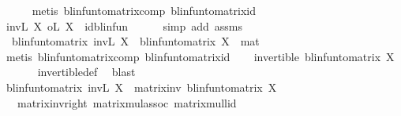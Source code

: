 \begin{isabellebody}
\ \ \ \ \isamarkupfalse%
\ {\isacharparenleft}{\kern0pt}metis\ blinfun{\isacharunderscore}{\kern0pt}to{\isacharunderscore}{\kern0pt}matrix{\isacharunderscore}{\kern0pt}comp\ blinfun{\isacharunderscore}{\kern0pt}to{\isacharunderscore}{\kern0pt}matrix{\isacharunderscore}{\kern0pt}id{\isacharparenright}{\kern0pt}\isanewline
\ \ \isamarkupfalse%
\ {\isachardoublequoteopen}inv\isactrlsub L\ X\ o\isactrlsub L\ X\ {\isacharequal}{\kern0pt}\ id{\isacharunderscore}{\kern0pt}blinfun{\isachardoublequoteclose}\isanewline
\ \ \ \ \isamarkupfalse%
\ {\isacharparenleft}{\kern0pt}simp\ add{\isacharcolon}{\kern0pt}\ assms{\isacharparenright}{\kern0pt}\isanewline
\ \ \isamarkupfalse%
\ {}{\isacharcolon}{\kern0pt}\ {\isachardoublequoteopen}blinfun{\isacharunderscore}{\kern0pt}to{\isacharunderscore}{\kern0pt}matrix\ {\isacharparenleft}{\kern0pt}inv\isactrlsub L\ X{\isacharparenright}{\kern0pt}\ {\isacharasterisk}{\kern0pt}{\isacharasterisk}{\kern0pt}\ blinfun{\isacharunderscore}{\kern0pt}to{\isacharunderscore}{\kern0pt}matrix\ {\isacharparenleft}{\kern0pt}X{\isacharparenright}{\kern0pt}\ {\isacharequal}{\kern0pt}\ mat\ {}{\isachardoublequoteclose}\isanewline
\ \ \ \ \isamarkupfalse%
\ {\isacharparenleft}{\kern0pt}metis\ blinfun{\isacharunderscore}{\kern0pt}to{\isacharunderscore}{\kern0pt}matrix{\isacharunderscore}{\kern0pt}comp\ blinfun{\isacharunderscore}{\kern0pt}to{\isacharunderscore}{\kern0pt}matrix{\isacharunderscore}{\kern0pt}id{\isacharparenright}{\kern0pt}\isanewline
\ \ \isamarkupfalse%
\ {\isachardoublequoteopen}invertible\ {\isacharparenleft}{\kern0pt}blinfun{\isacharunderscore}{\kern0pt}to{\isacharunderscore}{\kern0pt}matrix\ X{\isacharparenright}{\kern0pt}{\isachardoublequoteclose}\isanewline
\ \ \ \ \isamarkupfalse%
\ {\isachardoublequoteopen}{}{\isachardoublequoteclose}\ invertible{\isacharunderscore}{\kern0pt}def\ \isamarkupfalse%
\ blast\isanewline
\ \ \isamarkupfalse%
\ {\isachardoublequoteopen}blinfun{\isacharunderscore}{\kern0pt}to{\isacharunderscore}{\kern0pt}matrix\ {\isacharparenleft}{\kern0pt}inv\isactrlsub L\ X{\isacharparenright}{\kern0pt}\ {\isacharequal}{\kern0pt}\ matrix{\isacharunderscore}{\kern0pt}inv\ {\isacharparenleft}{\kern0pt}blinfun{\isacharunderscore}{\kern0pt}to{\isacharunderscore}{\kern0pt}matrix\ X{\isacharparenright}{\kern0pt}{\isachardoublequoteclose}\isanewline
\ \ \ \ \isamarkupfalse%
\ {}\ {}\ matrix{\isacharunderscore}{\kern0pt}inv{\isacharunderscore}{\kern0pt}right\ matrix{\isacharunderscore}{\kern0pt}mul{\isacharunderscore}{\kern0pt}assoc\ matrix{\isacharunderscore}{\kern0pt}mul{\isacharunderscore}{\kern0pt}lid\isanewline

\end{isabellebody}
